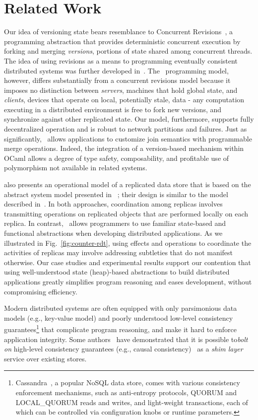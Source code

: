 \section{Related Work}
\label{sec:related}

Our idea of versioning state bears resemblance to Concurrent
Revisions~\cite{BBL+10}, a programming abstraction that provides
deterministic concurrent execution by forking and merging
\emph{versions}, portions of state shared among concurrent threads.
The idea of using revisions as a means to programming eventually
consistent distributed systems was further developed
in~\cite{BFL+12,Burckhardt2012}.  The \name\ programming model,
however, differs substantially from a concurrent revisions model
because it imposes no distinction between \emph{servers}, machines
that hold global state, and \emph{clients}, devices that operate on
local, potentially stale, data - any computation executing in a
distributed environment is free to fork new versions, and synchronize
against other replicated state.  Our model, furthermore, supports
fully decentralized operation and is robust to network partitions and
failures. Just as significantly, \name\ allows applications to
customize join semantics with programmable merge operations.  Indeed,
the integration of a version-based mechanism within OCaml allows a
degree of type safety, composability, and profitable use of
polymorphism not available in related systems.

\cite{Burckhardt2015} also presents an operational model of a
replicated data store that is based on the abstract system model
presented in ~\cite{Burckhardt2014}; their design is similar to the
model described in~\cite{pldi15}.  In both approaches, coordination
among replicas involves transmitting operations on replicated objects
that are performed locally on each replica.  In contrast,
\name\ allows programmers to use familiar state-based and functional
abstractions when developing distributed applications.  As we
illustrated in Fig.~\ref{fig:counter-rdt}, using effects and
operations to coordinate the activities of replicas may involve
addressing subtleties that do not manifest otherwise.  Our case
studies and experimental results support our contention that using
well-understood state (heap)-based abstractions to build distributed
applications greatly simplifies program reasoning and eases
development, without compromising efficiency.

Modern distributed systems are often equipped with only parsimonious
data models (e.g., key-value model) and poorly understood low-level
consistency guarantees\footnote{Cassandra~\cite{Cassandra}, a popular
  NoSQL data store, comes with various consistency enforcement
  mechanisms, such as anti-entropy protocols, {\sc QUORUM} and {\sc
    LOCAL\_QUORUM} reads and writes, and light-weight transactions,
  each of which can be controlled via configuration knobs or runtime
  parameters.}  that complicate program reasoning, and make it hard to
enforce application integrity. Some authors~\cite{bailis-bolton} have
demonstrated that it is possible to\emph{bolt on} high-level
consistency guarantees (e.g., causal consistency)~\cite{COPS,BEG+17}
as a \emph{shim layer} service over existing stores.


